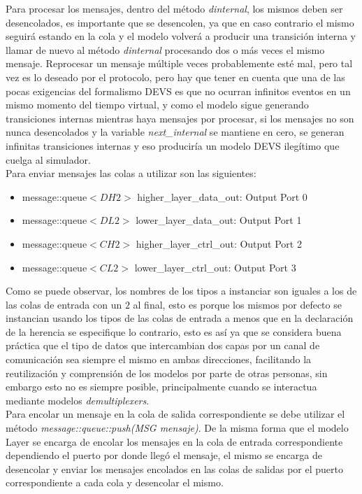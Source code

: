 \documentclass[10pt,a4paper]{article}
\begin{document}
Para procesar los mensajes, dentro del método \textit{dinternal}, los mismos deben ser desencolados, es importante que se desencolen, ya que en caso contrario el mismo seguirá estando en la cola y el modelo volverá a producir una transición interna y llamar de nuevo al método \textit{dinternal} procesando dos o más veces el mismo mensaje. Reprocesar un mensaje múltiple veces probablemente esté mal, pero tal vez es lo deseado por el protocolo, pero hay que tener en cuenta que una de las pocas exigencias del formalismo DEVS es que no ocurran infinitos eventos en un mismo momento del tiempo virtual, y como el modelo sigue generando transiciones internas mientras haya mensajes por procesar, si los mensajes no son nunca desencolados y la variable \textit{next\_internal} se mantiene en cero, se generan infinitas transiciones internas y eso produciría un modelo DEVS ilegítimo que cuelga al simulador. \\

Para enviar mensajes las colas a utilizar son las siguientes:
\begin{itemize}
\item message::queue$<DH2>$ higher\_layer\_data\_out: Output Port 0 
\item message::queue$<DL2>$ lower\_layer\_data\_out:  Output Port 1
\item message::queue$<CH2>$ higher\_layer\_ctrl\_out: Output Port 2
\item message::queue$<CL2>$ lower\_layer\_ctrl\_out:  Output Port 3
\end{itemize}

Como se puede observar, los nombres de los tipos a instanciar son iguales a los de las colas de entrada con un $2$ al final, esto es porque los mismos por defecto se instancian usando los tipos de las colas de entrada a menos que en la declaración de la herencia se especifique lo contrario, esto es así ya que se considera buena práctica que el tipo de datos que intercambian dos capas por un canal de comunicación sea siempre el mismo en ambas direcciones, facilitando la reutilización y comprensión de los modelos por parte de otras personas, sin embargo esto no es siempre posible, principalmente cuando se interactua mediante modelos \textit{demultiplexers}. \\

Para encolar un mensaje en la cola de salida correspondiente se debe utilizar el método \textit{message::queue::push(MSG mensaje)}. De la misma forma que el modelo Layer se encarga de encolar los mensajes en la cola de entrada correspondiente dependiendo el puerto por donde llegó el mensaje, el mismo se encarga de desencolar y enviar los mensajes encolados en las colas de salidas por el puerto correspondiente a cada cola y desencolar el mismo. \\
\end{document}
